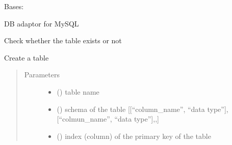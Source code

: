 \documentclass[letterpaper,10pt,english]{sphinxmanual}
\begin{document}
\begin{fulllineitems}
\label{\detokenize{bbc1.core.data_handler:bbc1.core.data_handler.MysqlAdaptor}}
Bases: 

DB adaptor for MySQL

\begin{fulllineitems}
\label{\detokenize{bbc1.core.data_handler:bbc1.core.data_handler.MysqlAdaptor.check_table_existence}}
Check whether the table exists or not

\end{fulllineitems}


\begin{fulllineitems}
\label{\detokenize{bbc1.core.data_handler:bbc1.core.data_handler.MysqlAdaptor.create_table}}
Create a table
\begin{quote}\begin{description}
\item[{Parameters}] \leavevmode\begin{itemize}
\item {} 
 () \textendash{} table name

\item {} 
 () \textendash{} schema of the table {[}{[}“column\_name”, “data type”{]},{[}“colmun\_name”, “data type”{]},,{]}

\item {} 
 () \textendash{} index (column) of the primary key of the table


\end{itemize}
\end{description}
\end{quote}
\end{fulllineitems}
\end{fulllineitems}
\end{document}
